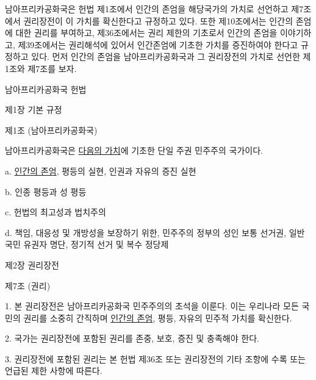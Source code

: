 남아프리카공화국은 헌법 제1조에서 인간의 존엄을 해당국가의 가치로 선언하고 제7조에서 권리장전이 이 가치를 확신한다고 규정하고 있다. 또한 제10조에서는 인간의 존엄에 대한 권리를 부여하고, 제36조에서는 권리 제한의 기초로서 인간의 존엄을 이야기하고, 제39조에서는 권리해석에 있어서 인간존엄에 기초한 가치를 증진하여야 한다고 규정하고 있다. 먼저 인간의 존엄을 남아프리카공화국과 그 권리장전의 가치로 선언한 제1조와 제7조를 보자.

\begin{displayquote}
남아프리카공화국 헌법

제1장 기본 규정

제1조 (남아프리카공화국)

남아프리카공화국은 \ul{다음의 가치}에 기초한 단일 주권 민주주의 국가이다.

a. \ul{인간의 존엄}, 평등의 실현, 인권과 자유의 증진 실현

b. 인종 평등과 성 평등

c. 헌법의 최고성과 법치주의

d. 책임, 대응성 및 개방성을 보장하기 위한, 민주주의 정부의 성인 보통 선거권, 일반 국민 유권자 명단, 정기적 선거 및 복수 정당제

제2장 권리장전

제7조 (권리)

1. 본 권리장전은 남아프리카공화국 민주주의의 초석을 이룬다. 이는 우리나라 모든 국민의 권리를 소중히 간직하며 \ul{인간의 존엄}, 평등, 자유의 민주적 가치를 확신한다.

2. 국가는 권리장전에 포함된 권리를 존중, 보호, 증진 및 충족해야 한다.

3. 권리장전에 포함된 권리는 본 헌법 제36조 또는 권리장전의 기타 조항에 수록 또는 언급된 제한 사항에 따른다.
\end{displayquote}

